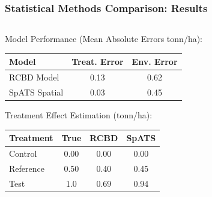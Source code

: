 \documentclass[aspectratio=43]{beamer}
\begin{document}
\begin{frame}
    \frametitle{Statistical Methods Comparison: Results}
    
    \begin{columns}
        \begin{column}{0.5\textwidth}
            \begin{block}{\small Model Performance \scriptsize (Mean Absolute Errors tonn/ha):}
                \begin{table}[h]
                    \centering
                    \scriptsize
                    \begin{tabular}{lcc}
                        \hline
                        \textbf{Model} & \textbf{Treat. Error} & \textbf{Env. Error} \\
                        \hline
                        RCBD Model & 0.13 & 0.62 \\
                        SpATS Spatial & 0.03 & 0.45 \\
                        \hline
                    \end{tabular}
                \end{table}
            \end{block}
            
            \begin{exampleblock}{\small Treatment Effect Estimation (tonn/ha):}
                \begin{table}[h]
                    \centering
                    \scriptsize
                    \begin{tabular}{lccc}
                        \hline
                        \textbf{Treatment} & \textbf{True} & \textbf{RCBD} & \textbf{SpATS} \\
                        \hline
                        Control & 0.00 & 0.00 & 0.00 \\
                        Reference & 0.50 & 0.40 & 0.45 \\
                        Test & 1.0 & 0.69 & 0.94 \\
                        \hline
                    \end{tabular}
                \end{table}
            \end{exampleblock}
        \end{column}
        

\end{columns}
\end{frame}
\end{document}
